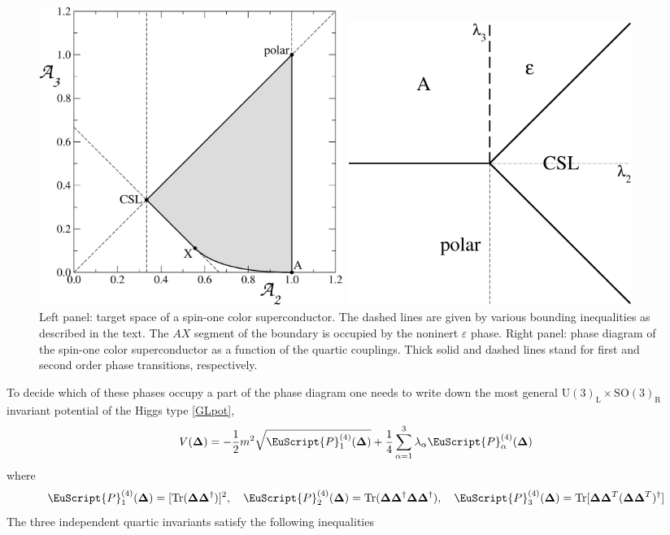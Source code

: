 \documentclass[final,3p,times,12pt,a4paper,sort&compress]{elsarticle}
\newcommand\gr[1]{\mathrm{#1}}              %
\newcommand\PP{\EuScript{P}}                %
\newcommand\he[1]{#1^{\dagger}}             %
\newcommand\ve{\varepsilon}
\newcommand\op{\mathbf\Delta}               %
\DeclareMathOperator{\Tr}{Tr}
\begin{document}
\begin{figure}
\parbox{0.5\textwidth}{\includegraphics[width=0.48\textwidth]{fig_kim}}\hfill
\parbox{0.45\textwidth}{\includegraphics[width=0.45\textwidth]{fig_spin1CSC}}
\caption{Left panel: target space of a spin-one color superconductor. The
dashed lines are given by various bounding inequalities as described in the
text. The $AX$ segment of the boundary is occupied by the noninert $\ve$ phase.
Right panel: phase diagram of the spin-one color superconductor as a function
of the quartic couplings. Thick solid and dashed lines stand for first and
second order phase transitions, respectively.}
\label{fig:spin1PD}
\end{figure}
To decide which of these phases occupy a part of the phase diagram one needs to
write down the most general $\gr{U(3)_L\times SO(3)_R}$ invariant potential of
the Higgs type \eqref{GLpot},
\begin{equation}
V(\op)=-\frac12m^2\sqrt{\PP^{(4)}_1(\op)}+\frac14\sum_{\alpha=1}^3
\lambda_\alpha\PP^{(4)}_\alpha(\op)
\end{equation}
where
\begin{equation}
\PP^{(4)}_1(\op)=[\Tr(\op\he\op)]^2,\quad
\PP^{(4)}_2(\op)=\Tr(\op\he\op\op\he\op),\quad
\PP^{(4)}_3(\op)=\Tr[\op\op^T\he{(\op\op^T)}]
\end{equation}
The three independent quartic invariants satisfy the following inequalities
\end{document}

